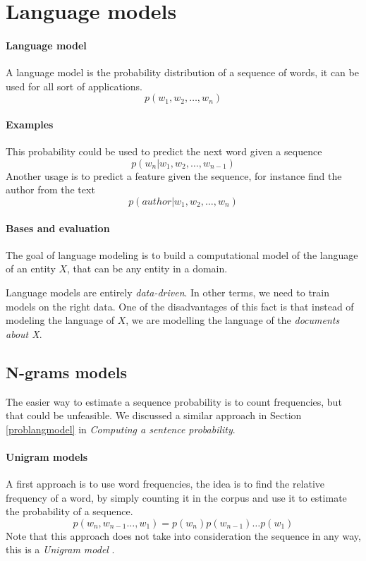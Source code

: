 \section{Language models}

\paragraph{Language model}
A language model is the probability distribution
of a sequence of words, it can be used for all sort 
of applications.
$$p(w_1, w_2, \dots, w_n)$$

\paragraph{Examples}
This probability could be used to predict the next word 
given a sequence
$$p(w_n | w_1, w_2, \dots, w_{n-1})$$
Another usage is to predict a feature given the sequence, 
for instance find the author from the text 
$$p(\mathit{author} | w_1, w_2, \dots, w_n)$$

\paragraph{Bases and evaluation}
The goal of language modeling is to build a computational model of the 
language of an entity $X$, that can be any entity in a domain.

Language models are entirely \emph{data-driven}. In other terms, 
we need to train models on the right data. One of the disadvantages of 
this fact is that instead of modeling the language of $X$, we are modelling
the language of the \emph{documents about X}.

\subsection{N-grams models}
The easier way to estimate a sequence probability is to count 
frequencies, but that could be unfeasible. We discussed a similar approach 
in Section \vref{problangmodel} in \emph{Computing a sentence probability}.

\paragraph{Unigram models}
A first approach is to use word frequencies, 
the idea is to find the relative frequency of a word, by simply counting 
it in the corpus and use it to estimate
the probability of a sequence.
$$p(w_n, w_{n-1}\dots, w_1) = p(w_n)p(w_{n-1})\dots p(w_1)$$
Note that this approach does not take into consideration the sequence in 
any way, this is a \emph{Unigram model} .

